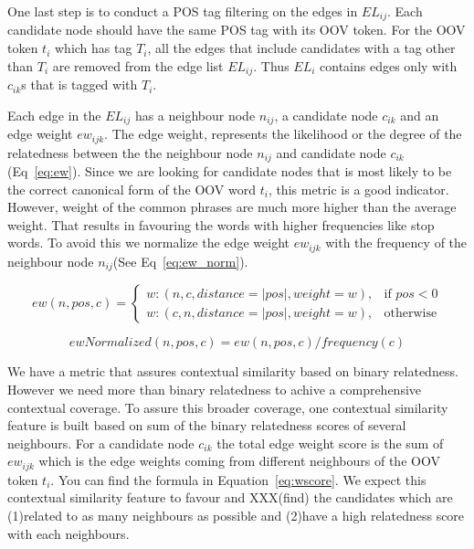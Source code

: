 \documentclass[preprint,review,12pt]{elsarticle}
\begin{document}
One last step is to conduct a POS tag filtering on the edges in $EL_{ij}$. Each candidate node should have the same POS tag with its OOV token. For the OOV token $t_i$ which has tag $T_i$, all the edges that include candidates with a tag other than $T_i$ are removed from the edge list $EL_{ij}$. Thus $EL_{i}$ contains edges only with $c_{ik}$s that is tagged with $T_i$.

Each edge in the $EL_{ij}$ has a neighbour node $n_{ij}$, a candidate node $c_{ik}$ and an edge weight $ew_{ijk}$. The edge weight, represents the likelihood or the degree of the relatedness between the the neighbour node $n_{ij}$ and candidate node $c_{ik}$(Eq~\ref{eq:ew}). Since we are looking for candidate nodes that is most likely to be the correct canonical form of the OOV word $t_i$, this metric is a good indicator. However, weight of the common phrases are much more higher than the average weight. That results in favouring the words with higher frequencies like stop words. To avoid this we normalize the edge weight $ew_{ijk}$ with the frequency of the neighbour node $n_{ij}$(See Eq~\ref{eq:ew_norm}).

\begin{equation}
ew(n,pos,c) =
\begin{cases}
  w : (n,c,distance = |pos|,weight=w), & \text{if } pos < 0 \\
  w : (c,n,distance = |pos|,weight=w), & \text{otherwise}
\end{cases}
\label{eq:ew}
\end{equation}

\begin{equation}
ewNormalized(n,pos,c) = ew(n,pos,c) / frequency(c)
\label{eq:ew_norm}
\end{equation}


We have a metric that assures contextual similarity based on binary relatedness. However we need more than binary relatedness to achive a comprehensive contextual coverage. To assure this broader coverage, one contextual similarity feature is built based on sum of the binary relatedness scores of several neighbours. For a candidate node $c_{ik}$ the total edge weight score is the sum of $ew_{ijk}$ which is the edge weights coming from different neighbours of the OOV token $t_i$. You can find the formula in Equation~\ref{eq:wscore}. We expect this contextual similarity feature to favour and XXX(find) the candidates which are (1)related to as many neighbours as possible and (2)have a high relatedness score with each neighbours.
\end{document}
